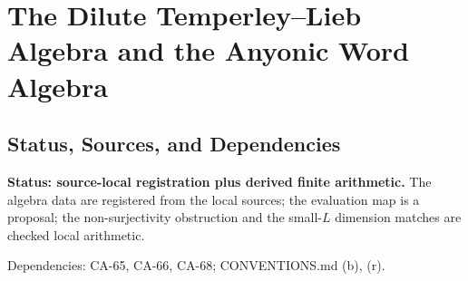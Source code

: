
\section{The Dilute Temperley--Lieb Algebra and the Anyonic Word Algebra}
\label{sec:dilute-tl-word-algebra}

\subsection{Status, Sources, and Dependencies}

\textbf{Status: source-local registration plus derived finite arithmetic.}
The algebra data are registered from the local sources; the evaluation map is
a proposal; the non-surjectivity obstruction and the small-\(L\) dimension
matches are checked local arithmetic.

Dependencies: CA-65, CA-66, CA-68; CONVENTIONS.md (b), (r).


